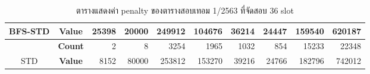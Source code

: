 \begin{table}[]
{\begin{tabular}{@{}ccrrrrrrrr@{}}
    \multirow{-2}{*}{BFS-STD}                    & \textbf{Value}                        & 25398                          & 20000                          & 249912                         & 104676                         & 36214                          & 24447                          & 159540                         & 620187                           \\ \midrule
                                                  & {\textbf{Count}} & {2}       & {8}       & {3254}    & {1965}    & {1032}    & {854}     & {15233}   & {22348}     \\ \cmidrule(l){2-10} 
    \multirow{-2}{*}{STD} & {\textbf{Value}} & {8152}    & {80000}   & {253812}  & {153270}  & {39216}   & {24766}   & {182796}  & {742012}    \\ \bottomrule
    \end{tabular}%
    }
    \caption{ตารางแสดงค่า penalty ของตารางสอบเทอม 1/2563 ที่จัดสอบ 36 slot}
    \label{tab:result_table_163_36}
\end{table}
